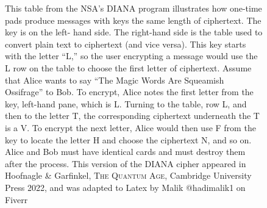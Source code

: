 \documentclass{article}
\begin{document}
\begin{figure}

\caption{This table from the NSA’s DIANA program illustrates how one-time pads produce messages with keys the same length of ciphertext. The key is on the left- hand side. The right-hand side is the table used to convert plain text to ciphertext (and vice versa). This key starts with the letter “L,” so the user encrypting a message would use the L row on the table to choose the first letter of ciphertext. Assume that Alice wants to say “The Magic Words Are Squeamish Ossifrage” to Bob. To encrypt, Alice notes the first letter from the key, left-hand pane, which is L. Turning to the table, row L, and then to the letter T, the corresponding ciphertext underneath the T is a V. To encrypt the next letter, Alice would then use F from the key to locate the letter H and choose the ciphertext N, and so on. Alice and Bob must have identical cards and must destroy them after the process. This version of the DIANA cipher appeared in Hoofnagle \& Garfinkel, \textsc{The Quantum Age}, Cambridge University Press 2022, and was adapted to Latex by Malik @hadimalik1 on Fiverr}
\end{figure}
\end{document}
